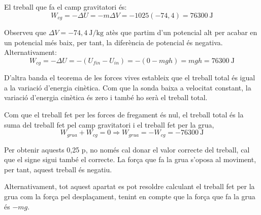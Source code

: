 \begin{solapartat}
 El treball que fa el camp gravitatori és:
\[ W_{cg} = -\Delta U = -m\Delta V = -1025(-74,4) = 76300\ \mathrm{J} \]

Observeu que $\Delta V = -74,4\ \mathrm{J/kg}$ atès que partim d'un potencial alt per acabar en un potencial més baix, per tant, la diferència de potencial és negativa. Alternativament:
\[ W_{cg} = -\Delta U = -(U_{fin} - U_{in}) = -(0 - mgh) = mgh = 76300\ \mathrm{J} \]

 D'altra banda el teorema de les forces vives estableix que el treball total és igual a la variació d'energia cinètica. Com que la sonda baixa a velocitat constant, la variació d'energia cinètica és zero i també ho serà el treball total.

 Com que el treball fet per les forces de fregament és nul, el treball total és la suma del treball fet pel camp gravitatori i el treball fet per la grua,
\[ W_{grua} + W_{cg} = 0 \Rightarrow W_{grua} = -W_{cg} = -76300\ \mathrm{J} \]

Per obtenir aquests 0,25 p, no només cal donar el valor correcte del treball, cal que el signe sigui també el correcte. La força que fa la grua s'oposa al moviment, per tant, aquest treball és negatiu.

Alternativament, tot aquest apartat es pot resoldre calculant el treball fet per la grua com la força pel desplaçament, tenint en compte que la força que fa la grua és $-mg$.
\end{solapartat}
